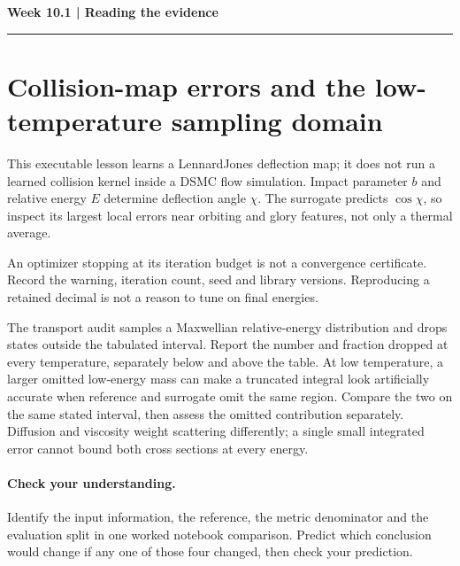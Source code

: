 \documentclass[11pt]{article}
\begin{document}
\noindent\textbf{Week 10.1 | Reading the evidence}\par\medskip\hrule\medskip
\section*{Collision-map errors and the low-temperature sampling domain}
This executable lesson learns a Lennard\textendash{}Jones deflection map; it does not run a
learned collision kernel inside a DSMC flow simulation. Impact parameter $b$ and
relative energy $E$ determine deflection angle $\chi$. The surrogate predicts
$\cos\chi$, so inspect its largest local errors near orbiting and glory features,
not only a thermal average.

An optimizer stopping at its iteration budget is not a convergence certificate.
Record the warning, iteration count, seed and library versions. Reproducing a
retained decimal is not a reason to tune on final energies.

The transport audit samples a Maxwellian relative-energy distribution and drops
states outside the tabulated interval. Report the number and fraction dropped
at every temperature, separately below and above the table. At low temperature,
a larger omitted low-energy mass can make a truncated integral look artificially
accurate when reference and surrogate omit the same region. Compare the two on
the same stated interval, then assess the omitted contribution separately.
Diffusion and viscosity weight scattering differently; a single small integrated
error cannot bound both cross sections at every energy.
\paragraph{Check your understanding.}
Identify the input information, the reference, the metric denominator and the
evaluation split in one worked notebook comparison. Predict which conclusion
would change if any one of those four changed, then check your prediction.
\end{document}
